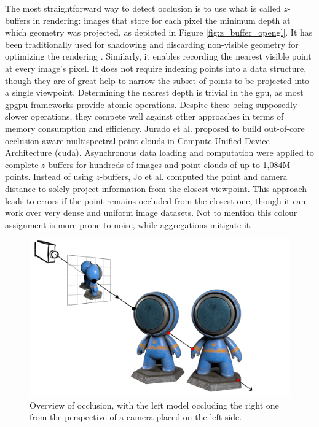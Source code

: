The most straightforward way to detect occlusion is to use what is called $z$-buffers in rendering: images that store for each pixel the minimum depth at which geometry was projected, as depicted in Figure \ref{fig:z_buffer_opengl}. It has been traditionally used for shadowing and discarding non-visible geometry for optimizing the rendering \cite{akenine-moller_real-time_2018, white_cascaded_2021}. Similarly, it enables recording the nearest visible point at every image's pixel. It does not require indexing points into a data structure, though they are of great help to narrow the subset of points to be projected into a single viewpoint. Determining the nearest depth is trivial in the \acrshort{gpu}, as most \acrshort{gpgpu} frameworks provide atomic operations. Despite these being supposedly slower operations, they compete well against other approaches in terms of memory consumption and efficiency. Jurado et al. \cite{jurado_out--core_2022} proposed to build out-of-core occlusion-aware multispectral point clouds in Compute Unified Device Architecture (\acrshort{cuda}). Asynchronous data loading and computation were applied to complete $z$-buffers for hundreds of images and point clouds of up to 1,084M points. Instead of using $z$-buffers, Jo et al. \cite{jo_dense_2021} computed the point and camera distance to solely project information from the closest viewpoint. This approach leads to errors if the point remains occluded from the closest one, though it can work over very dense and uniform image datasets. Not to mention this colour assignment is more prone to noise, while aggregations mitigate it. 

\begin{figure}[ht]
	\includegraphics[width=.8\textwidth]{figs/fundamentals/occlusion.png}
	\caption{Overview of occlusion, with the left model occluding the right one from the perspective of a camera placed on the left side. }
    \label{fig:occlusion_concept}
\end{figure}

